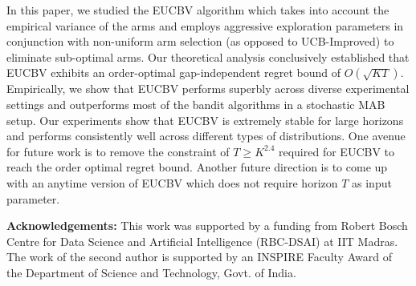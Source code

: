 In this paper, we studied the EUCBV algorithm which takes into account the empirical variance of the arms and employs aggressive exploration parameters in conjunction with non-uniform arm selection (as opposed to UCB-Improved) to eliminate sub-optimal arms. Our theoretical analysis conclusively established that EUCBV exhibits an order-optimal gap-independent regret bound of $O(\sqrt{KT})$. Empirically, we show that EUCBV performs superbly across diverse experimental settings and outperforms most of the bandit algorithms in a stochastic MAB setup. Our experiments show that EUCBV is extremely stable for large horizons and performs consistently well across different types of distributions. One avenue for future work is to remove the constraint of $T\geq K^{2.4}$ required for EUCBV to reach the order optimal regret bound. Another future direction is to come up with an anytime version of EUCBV which does not require horizon $T$ as input parameter.

\textbf{Acknowledgements:} This work was supported by a funding from Robert
Bosch Centre for Data Science and Artificial Intelligence (RBC-DSAI) at IIT Madras. The work of the second author is supported by an INSPIRE Faculty Award of the Department of Science and Technology, Govt. of India. 

%